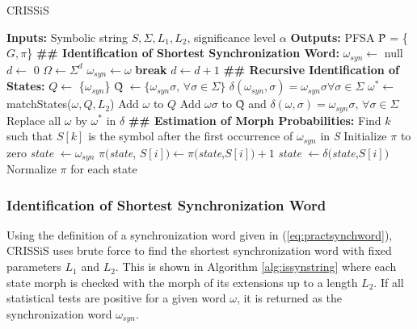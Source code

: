 {\begin{algorithm} 
  \caption{CRISSiS\label{alg:crissis}}
    \begin{algorithmic}[1]
      \State \textbf{Inputs:} Symbolic string $S, \Sigma, L_1, L_2$, significance level $\alpha$
      \State \textbf{Outputs:} PFSA \^{P} = \{$G, \pi$\}
      \State \textbf{\#\# Identification of Shortest Synchronization Word:}
      \State $\omega_{syn} \leftarrow $ null
      \State $d \leftarrow $ 0
      	\State $\Omega \leftarrow \Sigma^d$
      	\ForAll{$\omega \in \Omega$}
      			\State $\omega_{syn}\leftarrow\omega$
      			\State \textbf{break}
      		\EndIf
      	\EndFor
      	\State $d \leftarrow d + 1$
      \EndWhile
      \State \textbf{\#\# Recursive Identification of States:}
      \State $Q \leftarrow$ \{$\omega_{syn}$\}
      \State  \~{Q} $ \leftarrow \{\omega_{syn}\sigma,\, \forall \sigma \in \Sigma\}$
      \State $\delta(\omega_{syn},\sigma) = \omega_{syn}\sigma  \forall \sigma\in\Sigma$
      		\State $\omega^* \leftarrow$ matchStates($\omega, Q, L_2$)
      			\State Add $\omega$ to $Q$
      			\State Add $\omega\sigma$ to \~{Q} and $\delta(\omega,\sigma) = \omega_{syn}\sigma,\,  \forall \sigma\in\Sigma$
      		\Else
      			\State Replace all $\omega$ by $\omega^*$ in $\delta$
      		\EndIf
      	\EndIf
      \EndFor
      \State \textbf{\#\# Estimation of Morph Probabilities:}
      \State Find $k$ such that $S[k]$ is the symbol after the first occurrence of $\omega_{syn}$ in \textit{S}
      \State Initialize $\pi$ to zero
      \State \textit{state} $\leftarrow \omega_{syn}$
		\State $\pi($\textit{state}, $S[i]) \leftarrow \pi($\textit{state},$S[i]) + 1$
		\State \textit{state} $\leftarrow \delta($\textit{state},$S[i])$      
      \EndFor 
      \State Normalize $\pi$ for each state
    \end{algorithmic}
  \end{algorithm}
  
\subsubsection{Identification of Shortest Synchronization Word}

Using the definition of a synchronization word given in (\ref{eq:practsynchword}), CRISSiS uses brute force to find the shortest synchronization word with fixed parameters $L_1$ and $L_2$. This is shown in Algorithm \ref{alg:issynstring} where each state morph is checked with the morph of its extensions up to a length $L_2$. If all statistical tests are positive for a given word $\omega$, it is returned as the synchronization word $\omega_{syn}$.

}
